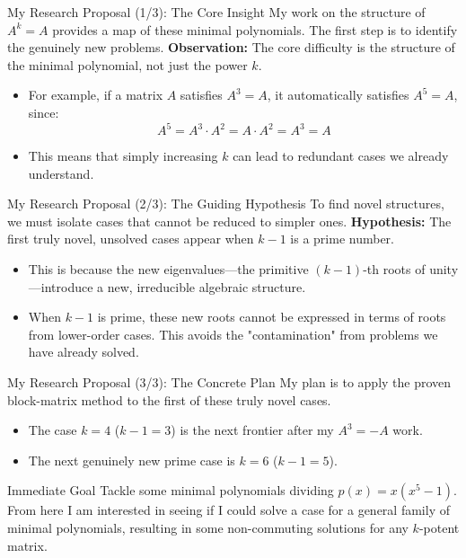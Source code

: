 \documentclass{beamer}
\begin{document}
\begin{frame}{My Research Proposal (1/3): The Core Insight}
  My work on the structure of $A^k=A$ provides a map of these minimal polynomials. The first step is to identify the genuinely new problems.
  \vfill
  \textbf{Observation:} The core difficulty is the structure of the minimal polynomial, not just the power $k$.
  \begin{itemize}
      \item For example, if a matrix $A$ satisfies $A^3=A$, it automatically satisfies $A^5=A$, since:
      \[A^5 = A^3 \cdot A^2 = A \cdot A^2 = A^3 = A\]
      \item This means that simply increasing $k$ can lead to redundant cases we already understand.
  \end{itemize}
\end{frame}

\begin{frame}{My Research Proposal (2/3): The Guiding Hypothesis}
  To find novel structures, we must isolate cases that cannot be reduced to simpler ones.
  \vfill
  \textbf{Hypothesis:} The first truly novel, unsolved cases appear when $k-1$ is a prime number.
  \begin{itemize}
      \item This is because the new eigenvalues—the primitive $(k-1)$-th roots of unity—introduce a new, irreducible algebraic structure.
      \item When $k-1$ is prime, these new roots cannot be expressed in terms of roots from lower-order cases. This avoids the "contamination" from problems we have already solved.
  \end{itemize}
\end{frame}

\begin{frame}{My Research Proposal (3/3): The Concrete Plan}
  My plan is to apply the proven block-matrix method to the first of these truly novel cases.
  \vfill
  \begin{itemize}
      \item The case $k=4$ ($k-1=3$) is the next frontier after my $A^3=-A$ work.
      \item The next genuinely new prime case is $k=6$ ($k-1=5$).
  \end{itemize}
  \begin{block}{Immediate Goal}
  Tackle some minimal polynomials dividing $p(x) = x(x^5-1)$. From here I am interested in seeing if I could solve a case for a general family of minimal polynomials, resulting in some non-commuting solutions for any $k$-potent matrix.
  \end{block}
\end{frame}
\end{document}
